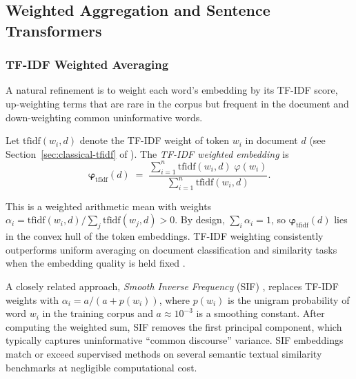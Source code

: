 \begin{deepdive}
\subsection{Weighted Aggregation and Sentence Transformers}
\label{sec:doc-repr-sbert}

\subsubsection{TF-IDF Weighted Averaging}

A natural refinement is to weight each word's embedding by its
TF-IDF score, up-weighting terms that are rare in the corpus but
frequent in the document and down-weighting common uninformative words.

\begin{definition}
\label{def:tfidf-embedding}
Let $\text{tfidf}(w_i, d)$ denote the TF-IDF weight of token $w_i$
in document $d$ (see Section~\ref{sec:classical-tfidf} of ).  The
\emph{TF-IDF weighted embedding} is
\begin{equation}
  \boldsymbol{\varphi}_{\mathrm{tfidf}}(d)
  \;=\;
  \frac{\displaystyle\sum_{i=1}^{n} \text{tfidf}(w_i, d)\; \varphi(w_i)}
       {\displaystyle\sum_{i=1}^{n} \text{tfidf}(w_i, d)}.
  \label{eq:tfidf-embedding}
\end{equation}
\end{definition}

This is a weighted arithmetic mean with weights $\alpha_i =
\text{tfidf}(w_i, d) / \sum_j \text{tfidf}(w_j, d) > 0$.  By
design, $\sum_i \alpha_i = 1$, so $\boldsymbol{\varphi}_{\mathrm{tfidf}}(d)$
lies in the convex hull of the token embeddings.  TF-IDF weighting
consistently outperforms uniform averaging on document classification
and similarity tasks when the embedding quality is held fixed
\cite{arora2017}. %

\begin{remark}
\label{rem:sif}
A closely related approach, \emph{Smooth Inverse Frequency} (SIF)
\cite{arora2017}, %
replaces TF-IDF weights with
$\alpha_i = a / (a + p(w_i))$,
where $p(w_i)$ is the unigram probability of word $w_i$ in the
training corpus and $a \approx 10^{-3}$ is a smoothing constant.
After computing the weighted sum, SIF removes the first principal
component, which typically captures uninformative ``common discourse''
variance.  SIF embeddings match or exceed supervised methods on
several semantic textual similarity benchmarks at negligible
computational cost.
\end{remark}


\end{deepdive}
